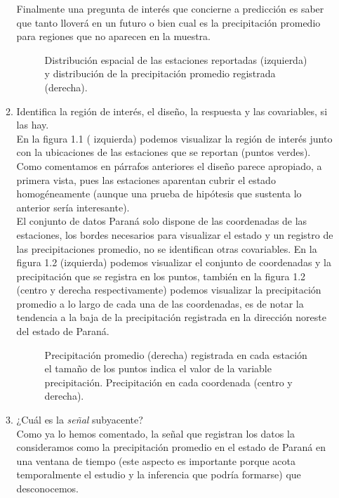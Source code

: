 \documentclass[paper=letter, fontsize=11pt]{scrartcl}
\numberwithin{equation}{section} %
\numberwithin{figure}{section} %
\numberwithin{table}{section} %
\begin{document}
\begin{enumerate}
\begin{enumerate}
Finalmente una pregunta de interés que concierne a predicción es saber que tanto lloverá en un futuro o bien cual es la precipitación promedio para regiones que no aparecen en la muestra.

\begin{figure}[htbp]
\caption{Distribución espacial de las estaciones reportadas (izquierda) y distribución de la precipitación promedio registrada (derecha).}
\label{img1}
\end{figure}
\FloatBarrier   



  \item Identifica la región de interés, el dise\~no, la respuesta y las covariables, si las hay.\\
  
 

En la figura 1.1 ( izquierda) podemos visualizar la región de interés junto con la ubicaciones de las estaciones que se reportan (puntos verdes). Como comentamos en párrafos anteriores el diseño parece apropiado, a primera vista, pues las estaciones aparentan cubrir el estado homogéneamente (aunque una prueba de hipótesis que sustenta lo anterior sería interesante). \\
El conjunto de datos Paraná solo dispone de las coordenadas de las estaciones, los bordes necesarios para visualizar el estado y un registro de las precipitaciones promedio, no se identifican otras covariables. En la figura 1.2 (izquierda) podemos visualizar el conjunto de coordenadas y la precipitación que se registra en los puntos, también en la figura 1.2 (centro y derecha respectivamente) podemos visualizar la precipitación promedio a lo largo de cada una de las coordenadas, es de notar la tendencia a la baja de la precipitación registrada en la dirección noreste del estado de Paraná.


\begin{figure}[htbp]
\caption{Precipitación promedio (derecha) registrada en cada estación el tamaño de los puntos indica el valor de la variable precipitación. Precipitación en cada coordenada (centro y derecha).}
\label{img1}
\end{figure}
\FloatBarrier   


  \item ¿Cuál es la \emph{señal} subyacente?\\
  Como ya lo hemos comentado, la señal que registran los datos la consideramos como la precipitación promedio en el estado de Paraná en una ventana de tiempo (este aspecto es importante porque acota temporalmente el estudio y la inferencia que podría formarse) que desconocemos.
  \end{enumerate}


\end{enumerate}
\end{document}
